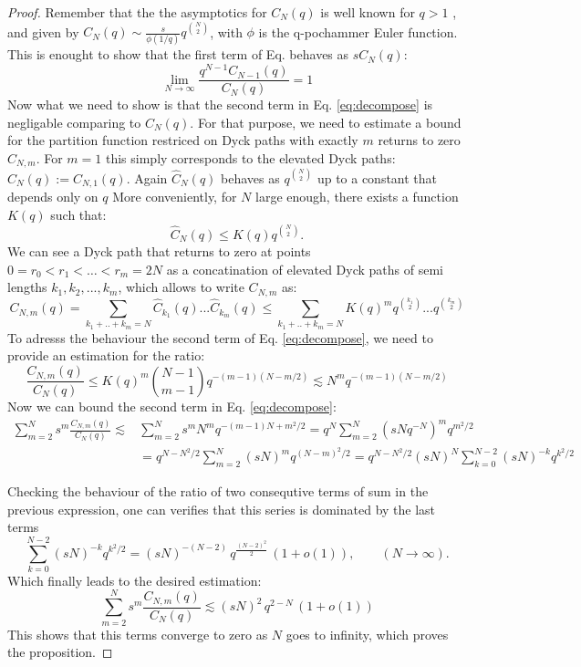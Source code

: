 \documentclass[pdflatex,sn-mathphys-num]{sn-jnl}
\theoremstyle{definition}
\theoremstyle{remark}
\numberwithin{equation}{section}
\begin{document}
\begin{proof}
Remember that the the asymptotics for $C_N(q)$ is well known for $q>1$ \cite{furlinger1985q, flajolet2009analytic}, and given by $C_N(q) \sim
\frac{s}{\phi(1/q)} q^{\binom{N}{2}} 
$, with $\phi$ is the q-pochammer Euler function. This is enought to show that the first term of Eq. behaves as $s C_N(q)$:
\begin{equation}
 \lim_{N \rightarrow \infty}   \frac{q^{N-1} C_{N-1}(q)}{C_{N}(q)} = 1
\end{equation}
Now what we need to show is that the second term in Eq. \ref{eq:decompose} is negligable comparing to $C_N(q)$.
For that purpose, we need to estimate a bound for the partition function restriced on Dyck paths with exactly $m$ returns to zero $C_{N,m}$. For $m=1$ this simply corresponds to the elevated Dyck paths: $\hat{C}_N(q) := C_{N,1}(q)$.
Again $\hat{C}_N(q)$ behaves as $q^{\binom{N}{2}}$ up to a constant that depends only on $q$
More conveniently, for $N$ large enough, there exists a function $K(q)$ such that:
$$\hat{C}_N(q) \leq K(q) q^{\binom{N}{2}}.$$
We can see a Dyck path that returns to zero at points  $0=r_{0}<r_{1}<\dots<r_{m}=2N$ as a concatination of elevated Dyck paths of semi lengths $k_1, k_2,...,k_m$, which allows to write $C_{N,m}$ as:
\begin{equation}
    C_{N,m}(q) = \sum_{k_1+..+k_m = N}  \hat{C}_{k_1}(q)... \hat{C}_{k_m}(q)
    \leq
     \sum_{k_1+..+k_m = N}  K(q)^m
     q^{\binom{k_1}{2}}...q^{\binom{k_m}{2}}
\end{equation}
To adresss the behaviour the second term of Eq. \ref{eq:decompose}, we need to provide an estimation for the ratio:
\begin{equation}
\frac{C_{N,m}(q) }{C_{N}(q) }
\leq
K(q)^m
\binom{N-1}{m-1}
q^{-(m-1)(N-m/2)}
\lesssim N^m q^{-(m-1)(N-m/2)}
\end{equation}
Now we can bound  the second term in Eq. \ref{eq:decompose}:
\begin{align}
   \sum_{m=2}^{N}s^{m}
    \frac{C_{N,m}(q) }{C_{N}(q)}
    \lesssim &
    \sum_{m=2}^{N} s^{m} N^m q^{-(m-1)N + m^2/2}
        =
    q^{N}\sum_{m=2}^{N} (s N q^{-N})^m q^{m^2/2} \\
&=  q^{N-N^2/2} 
    \sum_{m=2}^{N} (s N)^m q^{(N-m)^2/2}  =
  q^{N-N^2/2}  (s N)^N
    \sum_{k=0}^{N-2} (s N)^{-k} q^{k^2/2}
\end{align}

Checking the behaviour of the ratio of two consequtive terms of sum in the previous expression, one can verifies that this series is dominated by the last terms
\begin{equation}
   \sum_{k=0}^{N-2} (s N)^{-k} q^{k^2/2}
=
(sN)^{-(N-2)}\,q^{\frac{(N-2)^2}{2}}\,(1+o(1)),
\qquad (N\to\infty). 
\end{equation}
Which finally leads to the desired estimation:
\begin{equation}
   \sum_{m=2}^{N}s^{m}
    \frac{C_{N,m}(q) }{C_{N}(q)}
    \lesssim
(sN)^{2}\,q^{ 2 - N}\,(1+o(1))
\end{equation}
This shows that this terms converge to zero as $N$ goes to infinity, which proves the proposition.
\end{proof}
\end{document}
